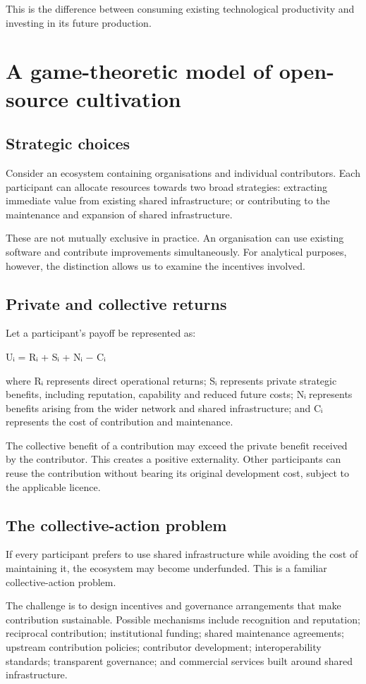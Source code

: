 \documentclass[11pt,a4paper]{article}
\begin{document}
This is the difference between consuming existing technological productivity and investing in its future production.

\section{A game-theoretic model of open-source cultivation}
\subsection{Strategic choices}
Consider an ecosystem containing organisations and individual contributors. Each participant can allocate resources towards two broad strategies: extracting immediate value from existing shared infrastructure; or contributing to the maintenance and expansion of shared infrastructure.

These are not mutually exclusive in practice. An organisation can use existing software and contribute improvements simultaneously. For analytical purposes, however, the distinction allows us to examine the incentives involved.

\subsection{Private and collective returns}
Let a participant's payoff be represented as:

Uᵢ = Rᵢ + Sᵢ + Nᵢ − Cᵢ

where Rᵢ represents direct operational returns; Sᵢ represents private strategic benefits, including reputation, capability and reduced future costs; Nᵢ represents benefits arising from the wider network and shared infrastructure; and Cᵢ represents the cost of contribution and maintenance.

The collective benefit of a contribution may exceed the private benefit received by the contributor. This creates a positive externality. Other participants can reuse the contribution without bearing its original development cost, subject to the applicable licence.

\subsection{The collective-action problem}
If every participant prefers to use shared infrastructure while avoiding the cost of maintaining it, the ecosystem may become underfunded. This is a familiar collective-action problem.

The challenge is to design incentives and governance arrangements that make contribution sustainable. Possible mechanisms include recognition and reputation; reciprocal contribution; institutional funding; shared maintenance agreements; upstream contribution policies; contributor development; interoperability standards; transparent governance; and commercial services built around shared infrastructure.
\end{document}
